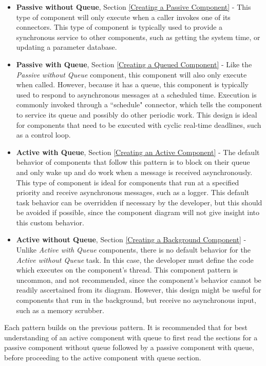 \vspace{5mm} %
\begin{itemize}
  \item \textbf{Passive without Queue}, Section \ref{Creating a Passive Component} - This type of component will only execute when a caller invokes one of its connectors. This type of component is typically used to provide a synchronous service to other components, such as getting the system time, or updating a parameter database.
  \item \textbf{Passive with Queue}, Section \ref{Creating a Queued Component} - Like the \textit{Passive without Queue} component, this component will also only execute when called. However, because it has a queue, this component is typically used to respond to asynchronous messages at a scheduled time. Execution is commonly invoked through a ``schedule" connector, which tells the component to service its queue and possibly do other periodic work. This design is ideal for components that need to be executed with cyclic real-time deadlines, such as a control loop.
  \item \textbf{Active with Queue}, Section \ref{Creating an Active Component} - The default behavior of components that follow this pattern is to block on their queue and only wake up and do work when a message is received asynchronously. This type of component is ideal for components that run at a specified priority and receive asynchronous messages, such as a logger. This default task behavior can be overridden if necessary by the developer, but this should be avoided if possible, since the component diagram will not give insight into this custom behavior.
  \item \textbf{Active without Queue}, Section \ref{Creating a Background Component} - Unlike \textit{Active with Queue} components, there is no default behavior for the \textit{Active without Queue} task. In this case, the developer must define the code which executes on the component's thread. This component pattern is uncommon, and not recommended, since the component's behavior cannot be readily ascertained from its diagram. However, this design might be useful for components that run in the background, but receive no asynchronous input, such as a memory scrubber.
\end{itemize}
\vspace{5mm} %

Each pattern builds on the previous pattern. It is recommended that for best understanding of an active component with queue to first read the sections for a passive component without queue followed by a passive component with queue, before proceeding to the active component with queue section.

